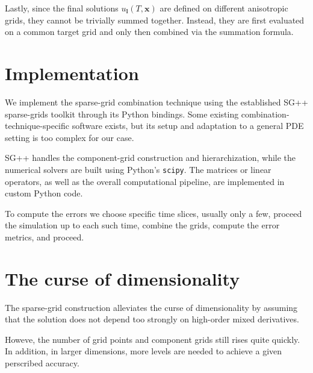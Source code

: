 Lastly, since the final solutions $u_\mathbf{l}(T,\mathbf x)$ are defined on different
anisotropic grids, they cannot be trivially summed together. Instead, they are first
evaluated on a common target grid and only then combined via the summation formula.




\section{Implementation}
We implement the sparse-grid combination technique using the established SG++ sparse-grids toolkit
through its Python bindings.
Some existing combination-technique-specific software exists\cite{discoadapt},
but its setup and adaptation to a general PDE setting is too complex for our case.

SG++ handles the component-grid construction and hierarchization,
while the numerical solvers are built using Python's \texttt{scipy}.
The matrices or linear operators, as well as the overall computational pipeline,
are implemented in custom Python code.

To compute the errors we choose specific time slices, usually only a few,
proceed the simulation up to each such time, combine the grids, compute the error metrics,
and proceed.



\section{The curse of dimensionality}

The sparse-grid construction alleviates the curse of dimensionality by assuming that
the solution does not depend too strongly on high-order mixed derivatives.

Howeve, the number of grid points and component grids still rises quite quickly.
In addition, in larger dimensions, more levels are needed to achieve a given perscribed accuracy.
